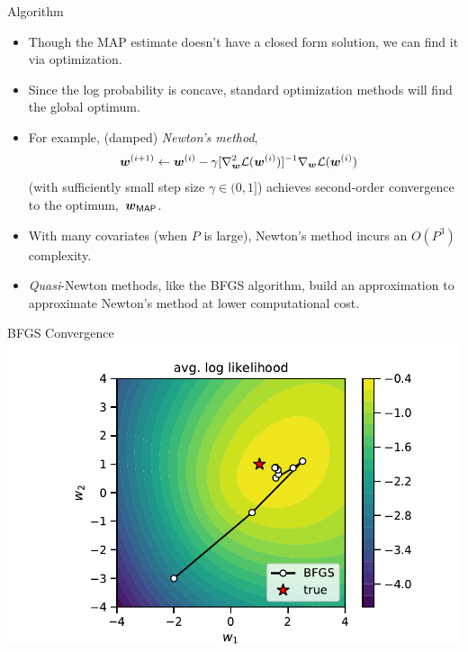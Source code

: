 \documentclass[aspectratio=169]{beamer}
\begin{document}
\begin{frame}{Algorithm}
\begin{itemize}

\item Though the MAP estimate doesn't have a closed form solution, we can find it via optimization. 

\item Since the log probability is concave, standard optimization methods will find the global optimum. 

\item For example, (damped) \emph{Newton's method},
\begin{align}
    \boldsymbol{w}^{(i+1)} &\leftarrow \boldsymbol{w}^{(i)} - \gamma [\nabla^2_{\boldsymbol{w}} \mathcal{L}(\boldsymbol{w}^{(i)})]^{-1} \nabla_{\boldsymbol{w}} \mathcal{L}(\boldsymbol{w}^{(i)}) 
\end{align}
(with sufficiently small step size $\gamma \in (0, 1]$) achieves second-order convergence to the optimum,~$\boldsymbol{w}_{\mathsf{MAP}}$.

\item With many covariates (when $P$ is large), Newton's method incurs an $O(P^3)$ complexity. 

\item \emph{Quasi}-Newton methods, like the BFGS algorithm, build an approximation to approximate Newton's method at lower computational cost. 

\end{itemize}

\end{frame}

\begin{frame}{BFGS Convergence}
    \centering
    \includegraphics[width=.75\textwidth]{figures/lap2/bfgs.pdf}
\end{frame}
\end{document}
